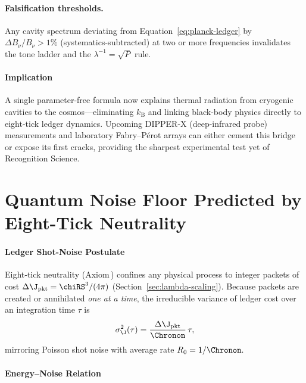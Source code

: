 \documentclass[11pt,oneside]{book}
\begin{document}
{\paragraph{Falsification thresholds.}
Any cavity spectrum deviating from
Equation~\ref{eq:planck-ledger} by  
\(\Delta B_{\nu}/B_{\nu}>1\%\) (systematics-subtracted) at two or more
frequencies invalidates the tone ladder and the
$\lambda^{-1}\!=\!\sqrt{P}$ rule.

\paragraph*{Implication}

A single parameter-free formula now explains thermal radiation from
cryogenic cavities to the cosmos—eliminating \(k_{\mathrm B}\) and
linking black-body physics directly to eight-tick ledger dynamics.
Upcoming DIPPER-X (deep-infrared probe) measurements and
laboratory Fabry–Pérot arrays can either cement this bridge or expose
its first cracks, providing the sharpest experimental test yet of
Recognition Science.

\section{Quantum Noise Floor Predicted by Eight-Tick Neutrality}
\label{sec:noise-floor}

\paragraph{Ledger Shot-Noise Postulate}

Eight‑tick neutrality (Axiom\,) confines any physical process to
integer packets of cost
\(
   \Delta\J_{\text{pkt}} = \chiRS^{3}/(4\pi)
\)
(Section~\ref{sec:lambda-scaling}).
Because packets are created or annihilated \emph{one at a time}, the
irreducible variance of ledger cost over an integration time $\tau$ is
\[
   \sigma_{\J}^{2}(\tau)
   =
   \frac{\Delta\J_{\text{pkt}}}{\Chronon}\,
   \tau,
\]
mirroring Poisson shot noise with average rate
\(
   R_{0}=1/\Chronon.
   \)

\paragraph{Energy–Noise Relation}

}
\end{document}
